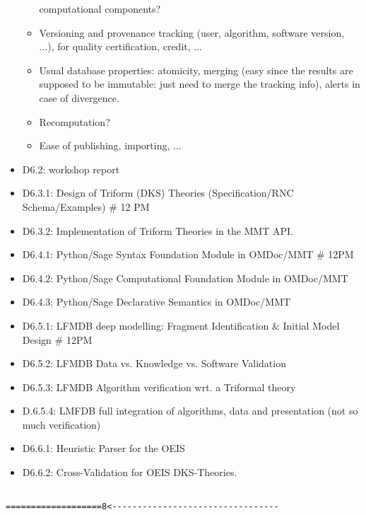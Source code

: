 \begin{Workpackage}{\thewpno}
\begin{WPDeliverables}
\begin{itemize}
\begin{itemize}
    computational components?
  \item Versioning and provenance tracking (user, algorithm, software
    version, ...), for quality certification, credit, ...
  \item Usual database properties: atomicity, merging (easy since the
    results are supposed to be immutable: just need to merge the
    tracking info), alerts in case of divergence.
  \item Recomputation?
  \item Ease of publishing, importing, ...
  \end{itemize}
\end{itemize}

\begin{itemize}
\item D6.2: workshop report
\item D6.3.1: Design of Triform (DKS) Theories (Specification/RNC Schema/Examples)          \# 12 PM
\item D6.3.2: Implementation of Triform Theories in the MMT API. 

\item D6.4.1: Python/Sage Syntax Foundation Module in OMDoc/MMT                                   \# 12PM
\item D6.4.2: Python/Sage Computational Foundation Module in OMDoc/MMT
\item D6.4.3: Python/Sage Declarative Semantics in OMDoc/MMT

\item D6.5.1: LFMDB deep modelling: Fragment Identification \& Initial Model Design              \# 12PM
\item D6.5.2: LFMDB Data vs. Knowledge vs. Software Validation
\item D6.5.3: LFMDB Algorithm verification wrt. a Triformal theory
\item D.6.5.4: LMFDB full integration of algorithms, data and presentation (not so much verification)

\item D6.6.1: Heuristic Parser for the OEIS
\item D6.6.2: Cross-Validation for OEIS DKS-Theories.
\end{itemize}
\end{WPDeliverables}
\begin{verbatim}

===================8<---------------------------------



\end{verbatim}
\end{Workpackage}
